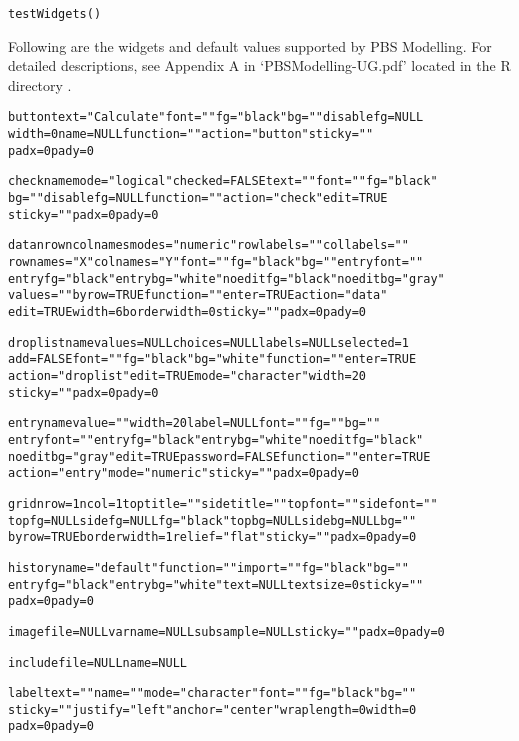\documentclass[letterpaper]{book}
\begin{document}
%
\begin{Usage}
\begin{verbatim}
testWidgets()
\end{verbatim}
\end{Usage}
%
\begin{Details}\relax
Following are the widgets and default values supported by PBS Modelling.
For detailed descriptions, see Appendix A in `PBSModelling-UG.pdf' 
located in the R directory .

\begin{alltt}
button text="Calculate" font="" fg="black" bg="" disablefg=NULL 
   width=0 name=NULL function="" action="button" sticky="" 
   padx=0 pady=0

check name mode="logical" checked=FALSE text="" font="" fg="black" 
   bg="" disablefg=NULL function="" action="check" edit=TRUE 
   sticky="" padx=0 pady=0

data nrow ncol names modes="numeric" rowlabels="" collabels="" 
   rownames="X" colnames="Y" font="" fg="black" bg="" entryfont="" 
   entryfg="black" entrybg="white" noeditfg="black" noeditbg="gray" 
   values="" byrow=TRUE function="" enter=TRUE action="data" 
   edit=TRUE width=6 borderwidth=0 sticky="" padx=0 pady=0

droplist name values=NULL choices=NULL labels=NULL selected=1 
   add=FALSE font="" fg="black" bg="white" function="" enter=TRUE 
   action="droplist" edit=TRUE mode="character" width=20 
   sticky="" padx=0 pady=0

entry name value="" width=20 label=NULL font="" fg="" bg="" 
   entryfont="" entryfg="black" entrybg="white" noeditfg="black" 
   noeditbg="gray" edit=TRUE password=FALSE function="" enter=TRUE 
   action="entry" mode="numeric" sticky="" padx=0 pady=0

grid nrow=1 ncol=1 toptitle="" sidetitle="" topfont="" sidefont="" 
   topfg=NULL sidefg=NULL fg="black" topbg=NULL sidebg=NULL bg="" 
   byrow=TRUE borderwidth=1 relief="flat" sticky="" padx=0 pady=0

history name="default" function="" import="" fg="black" bg="" 
   entryfg="black" entrybg="white" text=NULL textsize=0 sticky="" 
   padx=0 pady=0

image file=NULL varname=NULL subsample=NULL sticky="" padx=0 pady=0

include file=NULL name=NULL

label text="" name="" mode="character" font="" fg="black" bg="" 
   sticky="" justify="left" anchor="center" wraplength=0 width=0 
   padx=0 pady=0


\end{alltt}
\end{Details}
\end{document}
